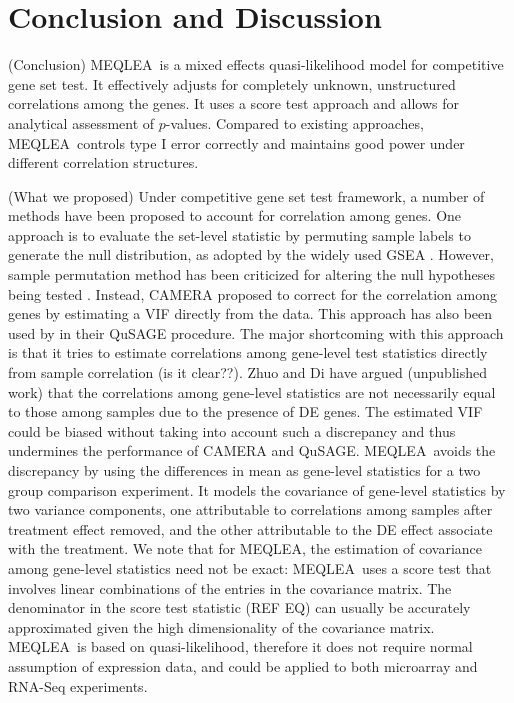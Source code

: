 \documentclass[a4,center,fleqn]{NAR}
\newcommand{\OurMethod}{MEQLEA}
\begin{document}
	\section{Conclusion and Discussion}\label{section:conclusion}
	
	(Conclusion) \OurMethod~is a mixed effects quasi-likelihood model for competitive gene set test. It
	effectively adjusts for completely unknown, unstructured correlations among the genes. It uses a
	score test approach and allows for analytical assessment of $p$-values. Compared to existing
	approaches, \OurMethod~controls type I error correctly and maintains good power under different
	correlation structures.  
	
	
	(What we proposed) Under competitive gene set test framework, a number of methods have been
	proposed to account for correlation among genes. One approach is to evaluate the set-level statistic
	by permuting sample labels to generate the null distribution, as adopted by the widely used GSEA
	\citep{subramanian2005gene}. However, sample permutation method has been criticized for  altering
	the null hypotheses being tested \citep{goeman2007analyzing, khatri2012ten}. Instead, CAMERA
	\citep{wu2012camera} proposed to correct for the correlation among genes by estimating a VIF
	directly from the data. This approach has also been used by \cite{yaari2013quantitative} in their
	QuSAGE procedure. The major shortcoming with this approach is that it tries to estimate correlations
	among gene-level test statistics directly from sample correlation (is it clear??). Zhuo and Di have
	argued (unpublished work) that the correlations among gene-level statistics are not necessarily
	equal to those among samples due to the presence of DE genes. The estimated VIF could be biased
	without taking into account such a discrepancy and thus undermines the performance of CAMERA and
	QuSAGE. \OurMethod~avoids the discrepancy by using the differences in mean as gene-level statistics
	for a two group comparison experiment. It models the covariance of gene-level statistics by two
	variance components, one attributable to correlations among samples after treatment effect removed,
	and the other attributable to the DE effect associate with the treatment. We note that for
	\OurMethod, the estimation of covariance among gene-level statistics need not be exact:
	\OurMethod~uses a score test that involves linear combinations of the entries in the covariance
	matrix. The denominator in the score test statistic (REF EQ) can usually be accurately approximated
	given the high dimensionality of the covariance matrix. \OurMethod~is based on quasi-likelihood,
	therefore it does not require normal assumption of expression data, and could be applied to both
	microarray and RNA-Seq experiments. 
	
\end{document}
